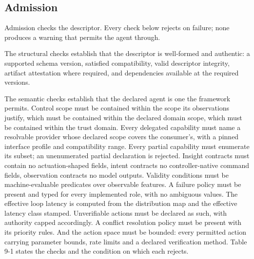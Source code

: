 \hypertarget{admission}{%
\subsection{Admission}\label{admission}}

Admission checks the descriptor. Every check below rejects on failure;
none produces a warning that permits the agent through.

The structural checks establish that the descriptor is well-formed and
authentic: a supported schema version, satisfied compatibility, valid
descriptor integrity, artifact attestation where required, and
dependencies available at the required versions.

The semantic checks establish that the declared agent is one the
framework permits. Control scope must be contained within the scope its
observations justify, which must be contained within the declared domain
scope, which must be contained within the trust domain. Every delegated
capability must name a resolvable provider whose declared scope covers
the consumer's, with a pinned interface profile and compatibility range.
Every partial capability must enumerate its subset; an unenumerated
partial declaration is rejected. Insight contracts must contain no
actuation-shaped fields, intent contracts no controller-native command
fields, observation contracts no model outputs. Validity conditions must
be machine-evaluable predicates over observable features. A failure
policy must be present and typed for every implemented role, with no
ambiguous values. The effective loop latency is computed from the
distribution map and the effective latency class stamped. Unverifiable
actions must be declared as such, with authority capped accordingly. A
conflict resolution policy must be present with its priority rules. And
the action space must be bounded: every permitted action carrying
parameter bounds, rate limits and a declared verification method. Table
9-1 states the checks and the condition on which each rejects.

